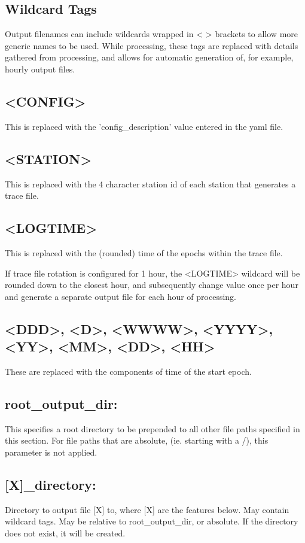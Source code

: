 \subsection{Wildcard Tags}
Output filenames can include wildcards wrapped in < > brackets to allow more generic names to be used. While processing, these tags are replaced with details gathered from processing, and allows for automatic generation of, for example, hourly output files.

\subsection{\textless CONFIG\textgreater}
This is replaced with the 'config\_description' value entered in the yaml file.
\subsection{\textless STATION\textgreater}
This is replaced with the 4 character station id of each station that generates a trace file.
\subsection{\textless LOGTIME\textgreater}
This is replaced with the (rounded) time of the epochs within the trace file.

If trace file rotation is configured for 1 hour, the <LOGTIME> wildcard will be rounded down to the closest hour, and subsequently change value once per hour and generate a separate output file for each hour of processing.

\subsection
{\textless DDD\textgreater,
\textless D\textgreater, 
\textless WWWW\textgreater, 
\textless YYYY\textgreater, 
\textless YY\textgreater, 
\textless MM\textgreater, 
\textless DD\textgreater, 
\textless HH\textgreater}
These are replaced with the components of time of the start epoch.


\subsection{root\_output\_dir:}
This specifies a root directory to be prepended to all other file paths specified in this section. For file paths that are absolute, (ie. starting with a /), this parameter is not applied.

\subsection{[X]\_directory:}
Directory to output file [X] to, where [X] are the features below. May contain wildcard tags. May be relative to root\_output\_dir, or absolute. If the directory does not exist, it will be created.

